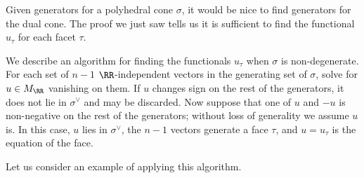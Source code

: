 \documentclass[12pt]{amsart}
\theoremstyle{plain}
\begin{document}
Given generators for a polyhedral cone $\sigma$, it would be nice to find generators for the dual cone.
The proof we just saw tells us it is sufficient to find the functional $u_\tau$ for each facet $\tau$.

We describe an algorithm for finding the functionals $u_\tau$ when $\sigma$ is non-degenerate.
For each set of $n-1$ $\RR$-independent vectors in the generating set of $\sigma$, solve for $u \in M_\RR$ vanishing on them.
If $u$ changes sign on the rest of the generators, it does not lie in $\sigma^\vee$ and may be discarded.
Now suppose that one of $u$ and $-u$ is non-negative on the rest of the generators; without loss of generality we assume $u$ is.
In this case, $u$ lies in $\sigma^\vee$, the $n-1$ vectors generate a face $\tau$, and $u = u_\tau$ is the equation of the face.

Let us consider an example of applying this algorithm.
\end{document}
